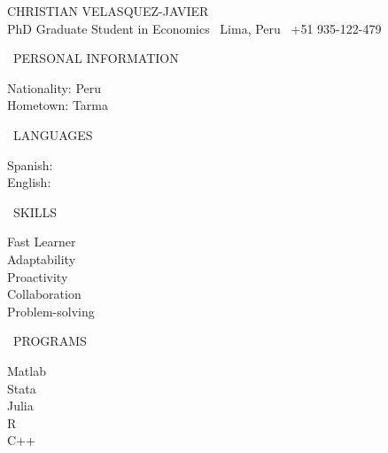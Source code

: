 \documentclass[11pt, a4paper]{article}
\begin{document}
	\begin{center}
		\huge{CHRISTIAN VELASQUEZ-JAVIER}\\ \vskip5pt
		\small{PhD Graduate Student in Economics \quad \faMapMarker \, Lima, Peru \quad \faMobilePhone \, +51 935-122-479}
	\end{center}
\vspace{0.5cm}
\begin{minipage}[l]{0.19\linewidth}
\vspace{-5.5cm}
\footnotesize 
\begin{center} \faChild \, PERSONAL INFORMATION \faChild \end{center}
\vspace{-10pt}
	Nationality: Peru\\
	Hometown: Tarma\\
\begin{center}\faGlobe\, LANGUAGES \faGlobe \end{center}
\vspace{-10pt}
Spanish: \faStar\faStar\faStar\faStar\faStar  \\
English: \faStar\faStar\faStar\faStar\faStarHalfEmpty \\
\begin{center} \faThumbsUp  \, SKILLS  \faThumbsUp \end{center}
\vspace{-10pt}
\centering Fast Learner \\  Adaptability \\ Proactivity \\ Collaboration \\ Problem-solving \\
\begin{center} \faCode\, PROGRAMS \faCode \end{center}
\vspace{-10pt}
\centering Matlab  \faStar\faStar\faStar\faStar\faStar \\ 
		   Stata   \faStar\faStar\faStar\faStar\faStar \\ 
		   Julia   \faStar\faStar\faStar\faStar\faStarHalfEmpty \\ 
		   R 	   \faStar\faStar\faStar\faStar\faStarO \\
		   C++     \faStar\faStar\faStar\faStar\faStarO \\ 
\end{minipage}
\end{document}
